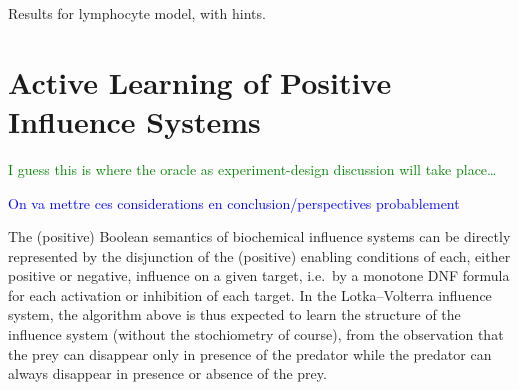 \documentclass{llncs}
\newcommand{\francois}[1]{\textcolor{blue}{#1}}
\newcommand{\sylvain}[1]{\textcolor{green}{#1}}
\begin{document}
\begin{listfig}
	
	\caption{Results for lymphocyte model, with hints.\label{hints.res}}
\end{listfig}


\section{Active Learning of Positive Influence Systems}
\label{sec:oracles}

\sylvain{I guess this is where the oracle as experiment-design discussion will
take place\dots}

\francois{On va mettre ces considerations en conclusion/perspectives probablement}

The (positive) Boolean semantics of biochemical influence systems
can be directly represented by the disjunction of the (positive) enabling conditions of each, either positive or negative, influence on a given target,
i.e.~by a monotone DNF formula for each activation or inhibition of each target.
In the Lotka--Volterra influence system, the algorithm above is thus expected to learn the structure of the influence system
(without the stochiometry of course),
from the observation that the prey can disappear only in presence of the predator
while the predator can always disappear in presence or absence of the prey.
\end{document}
